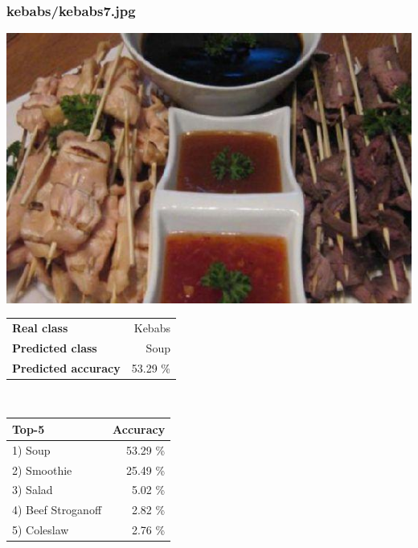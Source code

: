\subsubsection{kebabs/kebabs7.jpg}

\begin{minipage}[t]{0.4\textwidth}
	\vspace{0pt}
	\includegraphics[width=\linewidth]{images/evaluation-images/kebabs/kebabs7.jpg}
\end{minipage}
\hfill
\begin{minipage}[t]{0.5\textwidth}
	\vspace{0pt}\raggedright
	\begin{tabularx}{\textwidth}{X r}
		\small \textbf{Real class} & \small Kebabs\\
		\small \textbf{Predicted class} & \small Soup\\
		\small \textbf{Predicted accuracy} & \small 53.29 \%
    \end{tabularx}\\
    
    \vspace{6pt}
	\begin{tabularx}{\textwidth}{X r}
        \small \textbf{Top-5} & \small \textbf{Accuracy} \\
        \hline
		\small 1) Soup & \small 53.29 \%\\\small 2) Smoothie & \small 25.49 \%\\\small 3) Salad & \small 5.02 \%\\\small 4) Beef Stroganoff & \small 2.82 \%\\\small 5) Coleslaw & \small 2.76 \%
    \end{tabularx}
\end{minipage}
    

